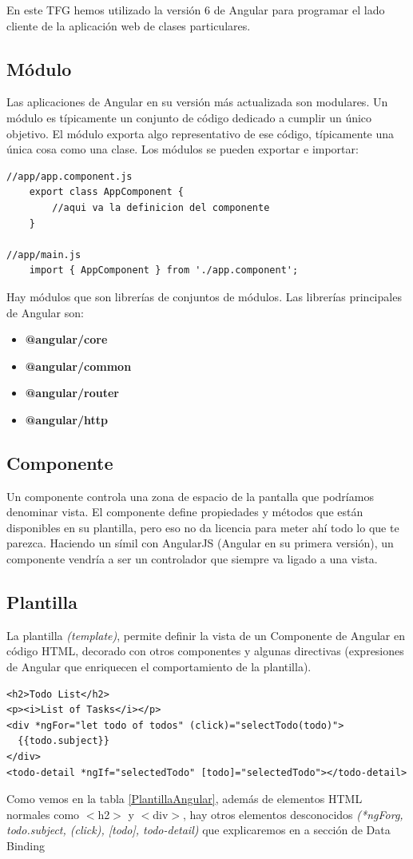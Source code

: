 En este TFG hemos utilizado la versión 6 de Angular para programar el lado cliente de la aplicación web de clases particulares.

\subsection{Módulo}
Las aplicaciones de Angular en su versión más actualizada son modulares. Un módulo es típicamente un conjunto de código dedicado a cumplir un único objetivo. El módulo exporta algo representativo de ese código, típicamente una única cosa como una clase. Los módulos se pueden exportar e importar:

\begin{lstlisting}
//app/app.component.js
    export class AppComponent {
        //aqui va la definicion del componente
    }

//app/main.js
    import { AppComponent } from './app.component';
\end{lstlisting}

Hay módulos que son librerías de conjuntos de módulos. Las librerías principales de Angular son:


\begin{itemize}
\item \textbf{@angular/core}
\item \textbf{@angular/common}
\item \textbf{@angular/router}
\item \textbf{@angular/http}
\end{itemize}


\subsection{Componente} Un componente controla una zona de espacio de la pantalla que podríamos denominar vista. El componente define propiedades y métodos que están disponibles en su plantilla, pero eso no da licencia para meter ahí todo lo que te parezca. Haciendo un símil con AngularJS (Angular en su primera versión), un componente vendría a ser un controlador que siempre va ligado a una vista.
\subsection{Plantilla} La plantilla \textit{(template)}, permite definir la vista de un Componente de Angular en código HTML, decorado con otros componentes y algunas directivas (expresiones de Angular que enriquecen el comportamiento de la plantilla).
\begin{lstlisting}[caption=Plantilla en Angular, label=PlantillaAngular]
<h2>Todo List</h2>
<p><i>List of Tasks</i></p>
<div *ngFor="let todo of todos" (click)="selectTodo(todo)">
  {{todo.subject}}
</div>
<todo-detail *ngIf="selectedTodo" [todo]="selectedTodo"></todo-detail>
\end{lstlisting}
Como vemos en la tabla \ref{PlantillaAngular}, además de elementos HTML normales como $<$h2$>$ y $<$div$>$, hay otros elementos desconocidos \textit{(*ngForg, todo.subject, (click), [todo], todo-detail)}  que explicaremos en a sección de Data Binding

